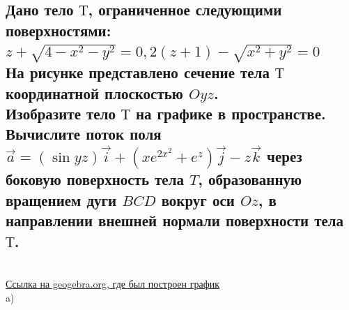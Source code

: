 \documentclass{article}
\begin{document}
        \subsection{Дано тело $Т$, ограниченное следующими поверхностями:\\
        $z + \sqrt{4 - x^2 - y^2} = 0, 2(z + 1) - \sqrt{x^2 + y^2} = 0$\\
        На рисунке представлено сечение тела $Т$ координатной плоскостью $Oyz$.\\
        Изобразите тело $Т$ на графике в пространстве.\\
        Вычислите поток поля $\vec{a} = (\sin{yz})\vec{i} + (xe^{2x^{2}} + e^{z})\vec{j} - z\vec{k}$ через боковую поверхность тела $T$, образованную вращением дуги $BCD$ вокруг оси $Oz$, в направлении внешней нормали поверхности тела $Т$.}
        \begin{figure}[h!]
        \end{figure}\\
        \href{https://www.geogebra.org/3d/vgwdzge5}{Ссылка на geogebra.org, где был построен график}\\
        a)\\
        \begin{figure}[h!]
        \end{figure}
\end{document}
